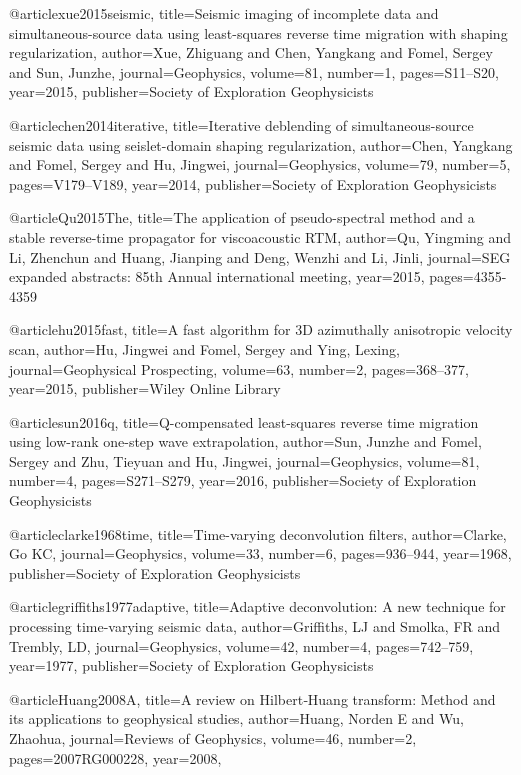 {@article{xue2015seismic,
  title={Seismic imaging of incomplete data and simultaneous-source data using least-squares reverse time migration with shaping regularization},
  author={Xue, Zhiguang and Chen, Yangkang and Fomel, Sergey and Sun, Junzhe},
  journal={Geophysics},
  volume={81},
  number={1},
  pages={S11--S20},
  year={2015},
  publisher={Society of Exploration Geophysicists}
}

@article{chen2014iterative,
  title={Iterative deblending of simultaneous-source seismic data using seislet-domain shaping regularization},
  author={Chen, Yangkang and Fomel, Sergey and Hu, Jingwei},
  journal={Geophysics},
  volume={79},
  number={5},
  pages={V179--V189},
  year={2014},
  publisher={Society of Exploration Geophysicists}
}

@article{Qu2015The,
  title={The application of pseudo-spectral method and a stable reverse-time propagator for viscoacoustic {RTM}},
  author={Qu, Yingming and Li, Zhenchun and Huang, Jianping and Deng, Wenzhi and Li, Jinli},
  journal={SEG expanded abstracts: 85th Annual international meeting},
  year={2015},
  pages={4355-4359}
}

@article{hu2015fast,
  title={A fast algorithm for 3D azimuthally anisotropic velocity scan},
  author={Hu, Jingwei and Fomel, Sergey and Ying, Lexing},
  journal={Geophysical Prospecting},
  volume={63},
  number={2},
  pages={368--377},
  year={2015},
  publisher={Wiley Online Library}
}

@article{sun2016q,
  title={Q-compensated least-squares reverse time migration using low-rank one-step wave extrapolation},
  author={Sun, Junzhe and Fomel, Sergey and Zhu, Tieyuan and Hu, Jingwei},
  journal={Geophysics},
  volume={81},
  number={4},
  pages={S271--S279},
  year={2016},
  publisher={Society of Exploration Geophysicists}
}

@article{clarke1968time,
  title={Time-varying deconvolution filters},
  author={Clarke, Go KC},
  journal={Geophysics},
  volume={33},
  number={6},
  pages={936--944},
  year={1968},
  publisher={Society of Exploration Geophysicists}
}

@article{griffiths1977adaptive,
  title={Adaptive deconvolution: A new technique for processing time-varying seismic data},
  author={Griffiths, LJ and Smolka, FR and Trembly, LD},
  journal={Geophysics},
  volume={42},
  number={4},
  pages={742--759},
  year={1977},
  publisher={Society of Exploration Geophysicists}
}

@article{Huang2008A,
  title={A review on {H}ilbert‐{H}uang transform: {M}ethod and its applications to geophysical studies},
  author={Huang, Norden E and Wu, Zhaohua},
  journal={Reviews of Geophysics},
  volume={46},
  number={2},
  pages={2007RG000228},
  year={2008},
}

}
